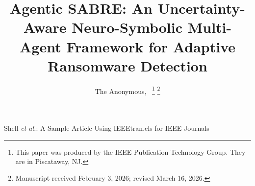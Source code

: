 \documentclass[lettersize,journal]{IEEEtran}
\begin{document}
\title{Agentic SABRE: An Uncertainty-Aware Neuro-Symbolic Multi-Agent Framework for Adaptive Ransomware Detection}

\author{The Anonymous,~
\thanks{This paper was produced by the IEEE Publication Technology Group. They are in Piscataway, NJ.}%
\thanks{Manuscript received February 3, 2026; revised March 16, 2026.}}

%
{Shell \MakeLowercase{\textit{et al.}}: A Sample Article Using IEEEtran.cls for IEEE Journals}



\maketitle
\end{document}
